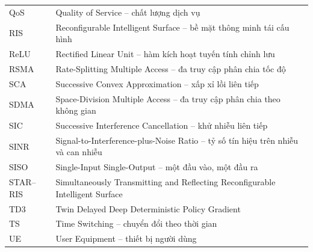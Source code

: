 \begin{longtable}{p{2.4cm}p{11.7cm}}
QoS & Quality of Service -- chất lượng dịch vụ\\
RIS & Reconfigurable Intelligent Surface -- bề mặt thông minh tái cấu hình\\
ReLU & Rectified Linear Unit -- hàm kích hoạt tuyến tính chỉnh lưu\\
RSMA & Rate-Splitting Multiple Access -- đa truy cập phân chia tốc độ\\
SCA & Successive Convex Approximation -- xấp xỉ lồi liên tiếp\\
SDMA & Space-Division Multiple Access -- đa truy cập phân chia theo không gian\\
SIC & Successive Interference Cancellation -- khử nhiễu liên tiếp\\
SINR & Signal-to-Interference-plus-Noise Ratio -- tỷ số tín hiệu trên nhiễu và can nhiễu\\
SISO & Single-Input Single-Output -- một đầu vào, một đầu ra\\
STAR--RIS & Simultaneously Transmitting and Reflecting Reconfigurable Intelligent Surface\\
TD3 & Twin Delayed Deep Deterministic Policy Gradient\\
TS & Time Switching -- chuyển đổi theo thời gian\\
UE & User Equipment -- thiết bị người dùng\\
\bottomrule
\end{longtable}
\clearpage
